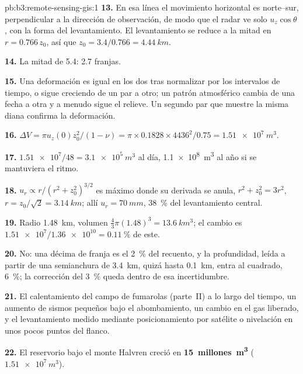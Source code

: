 \begin{solution}{pb:b3:remote-sensing-gis:1}
\textbf{13.} En esa línea el movimiento horizontal es norte--sur,
perpendicular a la dirección de observación, de modo que el radar ve solo $u_z\cos\theta$, con la
forma del levantamiento. El levantamiento se reduce a la mitad en $r = 0.766\,z_0$, así que $z_0 =
3.4/0.766 = \qty{4.44}{km}$.

\textbf{14.} La mitad de 5.4: 2.7 franjas.

\textbf{15.} Una deformación es igual en los dos  tras
normalizar por los intervalos de tiempo, o sigue creciendo de un par a otro; un
patrón atmosférico cambia de una fecha a otra y a menudo sigue el
relieve. Un segundo par que muestre la misma diana confirma la
deformación.

\textbf{16.} $\Delta V = \pi u_z(0)z_0^2/(1 - \nu) = \pi\times0.1828\times
4436^2/0.75 = \qty{1.51e7}{m^3}$.

\textbf{17.} $\num{1.51e7}/48 = \qty{3.1e5}{m^3}$ al día, \qty{1.1e8}{m^3}
al año si se mantuviera el ritmo.

\textbf{18.} $u_r \propto r/(r^2 + z_0^2)^{3/2}$ es máximo donde su
derivada se anula, $r^2 + z_0^2 = 3r^2$, $r = z_0/\sqrt2 = \qty{3.14}{km}$;
allí $u_r = \qty{70}{mm}$, \qty{38}{\percent} del levantamiento central.

\textbf{19.} Radio \qty{1.48}{km}, volumen $\frac43\pi(1.48)^3 =
\qty{13.6}{km^3}$; el cambio es $\num{1.51e7}/\num{1.36e10} =
\qty{0.11}{\percent}$ de este.

\textbf{20.} No: una décima de franja es el \qty{2}{\percent} del recuento, y
la profundidad, leída a partir de una semianchura de \qty{3.4}{km}, quizá hasta
\qty{0.1}{km}, entra al cuadrado, \qty{6}{\percent}; la corrección del
\qty{3}{\percent} queda dentro de esa incertidumbre.

\textbf{21.} El calentamiento del campo de fumarolas (parte~II) a lo largo del tiempo, un
aumento de sismos pequeños bajo el abombamiento, un cambio en el gas
liberado, y el levantamiento medido mediante posicionamiento por satélite o nivelación en
unos pocos puntos del flanco.

\textbf{22.} El reservorio bajo el monte Halvren creció en
\textbf{15~millones~\unit[text-series-to-math=true]{m^3}} ($\num{1.51e7}\,\unit{m^3}$).
\end{solution}

